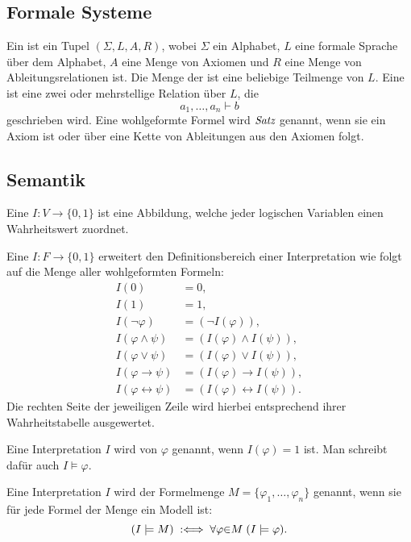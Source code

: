 \subsection{Formale Systeme}
\begin{definition}
Ein  ist ein Tupel $(\Sigma,L,A,R)$, wobei
$\Sigma$ ein Alphabet, $L$ eine formale Sprache über
dem Alphabet, $A$ eine Menge von Axiomen und $R$ eine Menge von
Ableitungsrelationen ist. Die Menge der  ist eine
beliebige Teilmenge von $L$. 
Eine  ist eine zwei oder mehrstellige
Relation über $L$, die
\begin{equation}
a_1,\ldots,a_n\vdash b
\end{equation}
geschrieben wird. Eine wohlgeformte Formel wird $\textit{Satz}$
genannt, wenn sie ein Axiom ist oder über eine Kette von
Ableitungen aus den Axiomen folgt.
\end{definition}

\subsection{Semantik}
\begin{definition}
Eine 
$I\colon V\to\{0,1\}$ ist eine Abbildung,
welche jeder logischen Variablen einen Wahrheitswert zuordnet.

Eine  $I\colon F\to\{0,1\}$ erweitert den
Definitionsbereich einer Interpretation wie folgt auf die
Menge aller wohlgeformten Formeln:
\begin{align}
I(0) &= 0,\\
I(1) &= 1,\\
I(\neg\varphi) &= (\neg I(\varphi)),\\
I(\varphi\land\psi) &= (I(\varphi)\land I(\psi)),\\
I(\varphi\lor\psi) &= (I(\varphi)\lor I(\psi)),\\
I(\varphi\rightarrow\psi) &= (I(\varphi)\rightarrow I(\psi)),\\
I(\varphi\leftrightarrow\psi) &= (I(\varphi)\leftrightarrow I(\psi)).
\end{align}
Die rechten Seite der jeweiligen Zeile wird hierbei entsprechend
ihrer Wahrheitstabelle ausgewertet.
\end{definition}

\begin{definition}[Modell]
Eine Interpretation $I$ wird 
von $\varphi$ genannt, wenn $I(\varphi)=1$ ist. Man schreibt
dafür auch $I\models\varphi$.

Eine Interpretation $I$ wird  der Formelmenge
$M=\{\varphi_1,\ldots,\varphi_n\}$ genannt, wenn sie für jede
Formel der Menge ein Modell ist:
\begin{equation}
(I\models M) \;:\Longleftrightarrow\; \forall\varphi{\in}M\;(I\models\varphi).
\end{equation}
\end{definition}

